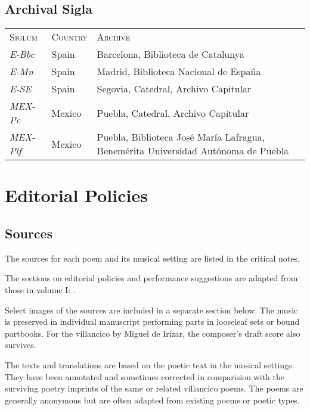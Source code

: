 \subsection{Archival Sigla}

\begin{tabulary}{\textwidth}{llL}
    \textsc{Siglum} & \textsc{Country} & \textsc{Archive} \\

    \emph{E-Bbc}
    & Spain
    & Barcelona, Biblioteca de Catalunya \\

    \emph{E-Mn}
    & Spain
    & Madrid, Biblioteca Nacional de España \\

    \emph{E-SE}
    & Spain
    & Segovia, Catedral, Archivo Capitular \\

    \emph{MEX-Pc}
    & Mexico
    & Puebla, Catedral, Archivo Capitular \\

    \emph{MEX-Plf}
    & Mexico
    & Puebla, Biblioteca José María Lafragua, Benemérita Universidad Autónoma
    de Puebla \\
\end{tabulary}


\section{Editorial Policies}

\subsection{Sources}
The sources for each poem and its musical setting are listed in the 
critical notes.%
\begin{Footnote}
    The sections on editorial policies and performance suggestions are adapted
    from those in volume I: \autocite[5--11]{Cashner:WLSCM32}.
\end{Footnote}
Select images of the sources are included in a separate section below.
The music is preserved in individual manuscript performing parts in looseleaf 
sets or bound partbooks.
For the villancico by Miguel de Irízar, the composer's draft score also 
survives.

The texts and translations are based on the poetic text in the musical settings.
They have been annotated and sometimes corrected in comparision with the 
surviving poetry imprints of the same or related villancico poems.
The poems are generally anonymous but are often adapted from existing poems or 
poetic types.

